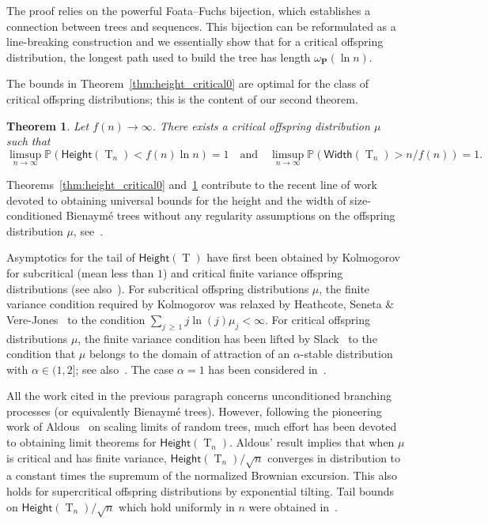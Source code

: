 \documentclass[10pt]{amsart}
\newtheorem{theo}{Theorem}[section]
\theoremstyle{definition}\newtheorem{defi}[theo]{Definition}\newtheorem{rema}[theo]{Remark}\newtheorem{exam}[theo]{Example}\newtheorem{exem}[theo]{Example}\newtheorem{nota}[theo]{Notation}
\renewcommand{\P}{\mathbb{P}}
\renewcommand{\H}{\mathsf{Height}}
\newcommand{\p}{\mathbf{P}}
\newcommand{\Width}{\mathsf{Width}}
\DeclareMathOperator{\rtree}{T}
\newcommand{\Tn}{\rtree_{n}}
\begin{document}
The proof relies on the powerful Foata--Fuchs bijection, which establishes a connection between trees and sequences. This bijection can be reformulated as a line-breaking construction and we essentially show that for a critical offspring distribution, the longest path used to build the tree has length $\omega_{\p}(\ln n)$.

The bounds in Theorem~\ref{thm:height_critical0} are optimal for the class of critical offspring distributions; this is the content of our second theorem.

\begin{theo}\label{thm:critical_short_trees0}
Let $f(n)\to \infty$. There exists a critical offspring distribution $\mu$ such that
\[
\limsup_{n\to \infty} \P\left(\H(\rtree_{n})<f(n)\ln n\right)=1
\quad \text{and} \quad
\limsup_{n\to \infty} \P\left(\Width(\rtree_{n})> n/f(n)\right)=1.
\]
\end{theo}

Theorems~\ref{thm:height_critical0} and~\ref{thm:critical_short_trees0} contribute to the recent line of work devoted to obtaining universal bounds for the height and the width of size-conditioned Bienaymé trees without any regularity assumptions on the offspring distribution $\mu$, see~\cite{Add19,ABHK21,AD22}.

Asymptotics for the tail of $\H(\rtree)$ have first been obtained by Kolmogorov \cite{Kol38} for subcritical (mean less than $1$) and critical finite variance offspring distributions (see also~\cite[Eq.~(9.5) and~(10.8)]{Har63}). For subcritical offspring distributions $\mu$, the finite variance condition required by Kolmogorov was relaxed by Heathcote, Seneta \& Vere-Jones~\cite{HSV67} to the condition $\sum_{j\,\geq\,1} j \ln(j) \mu_{j} < \infty$. For critical offspring distributions $\mu$, the finite variance condition has been lifted by Slack~\cite{Sla68} to the condition that $\mu$ belongs to the domain of attraction of an $\alpha$-stable distribution with $\alpha \in (1,2]$; see also~\cite{BS71}. The case $\alpha=1$ has been considered in~\cite{LS08,NW07,Sze76}.

All the work cited in the previous paragraph concerns unconditioned branching processes (or equivalently Bienaymé trees). However, following the pioneering work of Aldous~\cite{Ald93} on scaling limits of random trees, much effort has been devoted to obtaining limit theorems for $\H(\Tn)$. Aldous' result implies that when $\mu$ is critical and has finite variance, $\H(\Tn)/\sqrt{n}$ converges in distribution to a constant times the supremum of the normalized Brownian excursion. This also holds for supercritical offspring distributions by exponential tilting. Tail bounds on $\H(\Tn)/\sqrt{n}$ which hold uniformly in $n$ were obtained in~\cite{ADS13}.
\end{document}
